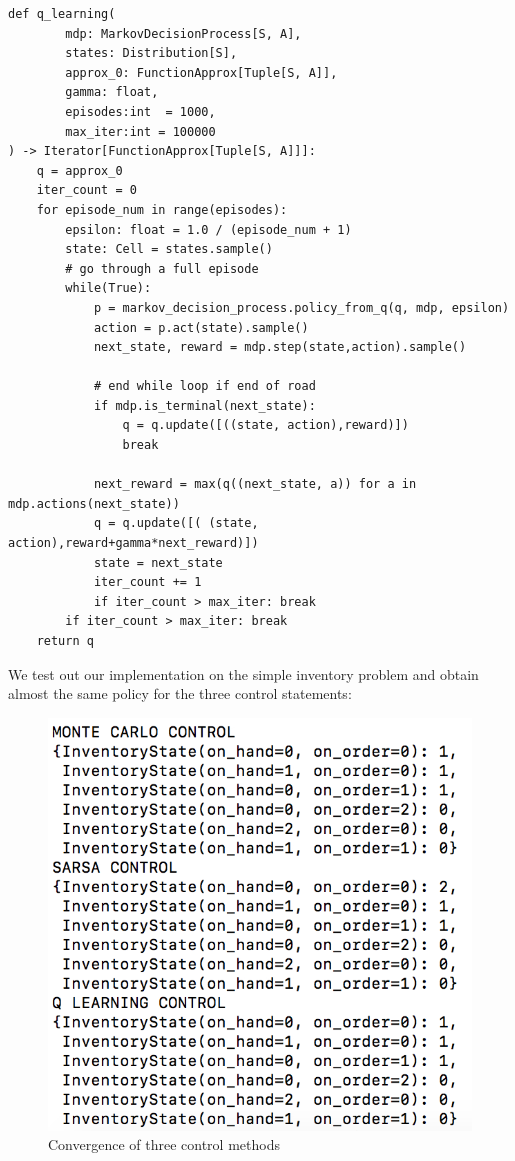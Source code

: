 \documentclass{article}[12pt]
\begin{document}
\begin{lstlisting}
def q_learning(
        mdp: MarkovDecisionProcess[S, A],
        states: Distribution[S],
        approx_0: FunctionApprox[Tuple[S, A]],
        gamma: float,
        episodes:int  = 1000,
        max_iter:int = 100000
) -> Iterator[FunctionApprox[Tuple[S, A]]]:
    q = approx_0
    iter_count = 0
    for episode_num in range(episodes):
        epsilon: float = 1.0 / (episode_num + 1)
        state: Cell = states.sample()
        # go through a full episode
        while(True):
            p = markov_decision_process.policy_from_q(q, mdp, epsilon)
            action = p.act(state).sample()
            next_state, reward = mdp.step(state,action).sample()
            
            # end while loop if end of road
            if mdp.is_terminal(next_state):
                q = q.update([((state, action),reward)])
                break

            next_reward = max(q((next_state, a)) for a in mdp.actions(next_state))
            q = q.update([( (state, action),reward+gamma*next_reward)])
            state = next_state
            iter_count += 1
            if iter_count > max_iter: break
        if iter_count > max_iter: break
    return q
\end{lstlisting}

We test out our implementation on the simple inventory problem and obtain almost the same policy for the three control statements:
\begin{figure}
  \includegraphics[width=0.5\linewidth]{Result_SIMDP.png}
  \caption{Convergence of three control methods}
  \label{fig:optPol1}
\end{figure}
\end{document}
